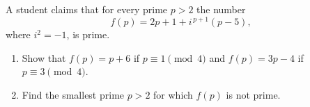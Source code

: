 A student claims that for every prime $p>2$ the number
\[
f(p)=2p+1+i^{\,p+1}(p-5),
\]
where $i^2=-1$, is prime.
\begin{enumerate}
\item[(a)] Show that $f(p)=p+6$ if $p\equiv1\pmod4$ and $f(p)=3p-4$ if $p\equiv3\pmod4$.
\item[(b)] Find the smallest prime $p>2$ for which $f(p)$ is not prime.
\end{enumerate}
